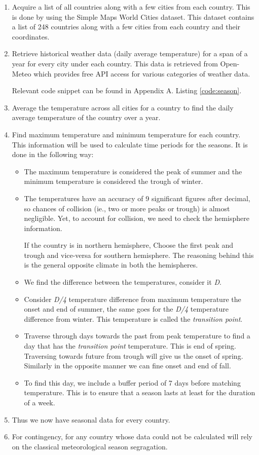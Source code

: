 \begin{enumerate}
    \item Acquire a list of all countries along with a few cities from each country. This is done by using the Simple Maps World Cities dataset\cite{world_cities}. This dataset contains a list of 248 countries along with a few cities from each country and their coordinates.
    \item Retrieve historical weather data (daily average temperature) for a span of a year for every city under each country. This data is retrieved from Open-Meteo\cite{Zippenfenig_Open-Meteo} which provides free API access for various categories of weather data.

    Relevant code snippet can be found in Appendix A. Listing \ref{code:season}.
    \item Average the temperature across all cities for a country to find the daily average temperature of the country over a year.
    \item Find maximum temperature and minimum temperature for each country. This information will be used to calculate time periods for the seasons. It is done in the following way:
    \begin{itemize}
        \item The maximum temperature is considered the peak of summer and the minimum temperature is considered the trough of winter.
        \item The temperatures have an accuracy of 9 significant figures after decimal, so chances of collision (ie., two or more peaks or trough) is almost negligible. Yet, to account for collision, we need to check the hemisphere information.

        If the country is in northern hemisphere, Choose the first peak and trough and vice-versa for southern hemisphere. The reasoning behind this is the general opposite climate in both the hemispheres.
        \item We find the difference between the temperatures, consider it \textit{D}.
        \item Consider \textit{D/4} temperature difference from maximum temperature the onset and end of summer, the same goes for the \textit{D/4} temperature difference from winter. This temperature is called the \textit{transition point}.
        \item Traverse through days towards the past from peak temperature to find a day that has the \textit{transition point} temperature. This is end of spring. Traversing towards future from trough will give us the onset of spring. Similarly in the opposite manner we can fine onset and end of fall.
        \item To find this day, we include a buffer period of 7 days before matching temperature. This is to ensure that a season lasts at least for the duration of a week.
    \end{itemize}
    \item Thus we now have seasonal data for every country.
    \item For contingency, for any country whose data could not be calculated will rely on the classical meteorological season segragation.
\end{enumerate}

